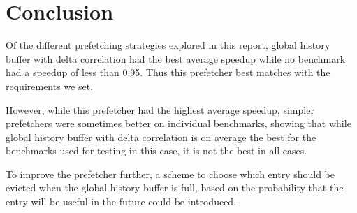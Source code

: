 \section{Conclusion}
\label{sec:conclusion}

Of the different prefetching strategies explored in this report,
global history buffer with delta correlation had the best average
speedup while no benchmark had a speedup of less than 0.95. Thus
this prefetcher best matches with the requirements we set.

However, while this prefetcher had the highest average
speedup, simpler prefetchers were sometimes better on
individual benchmarks, showing that while global history buffer
with delta correlation is on average the best for the benchmarks
used for testing in this case, it is not the best in all cases.

To improve the prefetcher further, a scheme to choose which
entry should be evicted when the global history buffer is full,
based on the probability that the entry will be useful in the
future could be introduced.


